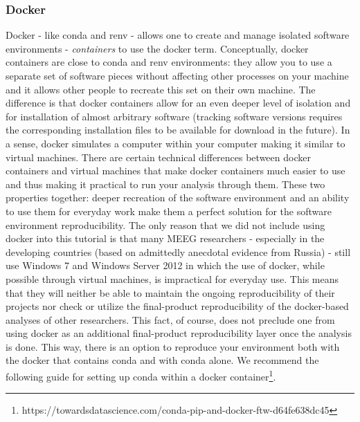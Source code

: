 \documentclass[a4paper,man,floatsintext,natbib]{apa6}
\begin{document}
\subsubsection{Docker}
Docker - like conda and renv - allows one to create and manage isolated software environments - \emph{containers} to use the docker term. Conceptually, docker containers are close to conda and renv environments: they allow you to use a separate set of software pieces without affecting other processes on your machine and it allows other people to recreate this set on their own machine. The difference is that docker containers allow for an even deeper level of isolation and for installation of almost arbitrary software (tracking software versions requires the corresponding installation files to be available for download in the future). In a sense, docker simulates a computer within your computer making it similar to virtual machines. There are certain technical differences between docker containers and virtual machines that make docker containers much easier to use and thus making it practical to run your analysis through them. These two properties together: deeper recreation of the software environment and an ability to use them for everyday work make them a perfect solution for the software environment reproducibility. The only reason that we did not include using docker into this tutorial is that many MEEG researchers - especially in the developing countries (based on admittedly anecdotal evidence from Russia) - still use Windows 7 and Windows Server 2012 in which the use of docker, while possible through virtual machines, is impractical for everyday use. This means that they will neither be able to maintain the ongoing reproducibility of their projects nor check or utilize the final-product reproducibility of the docker-based analyses of other researchers. This fact, of course, does not preclude one from using docker as an additional final-product reproducibility layer once the analysis is done. This way, there is an option to reproduce your environment both with the docker that contains conda and with conda alone. We recommend the following guide for setting up conda within a docker container\footnote{https://towardsdatascience.com/conda-pip-and-docker-ftw-d64fe638dc45 }.
\end{document}
